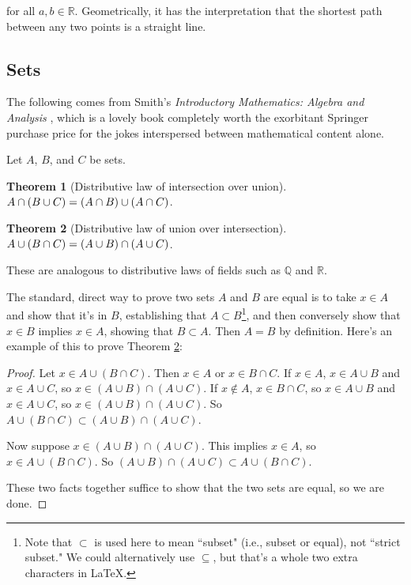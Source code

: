 \documentclass{article}
\theoremstyle{definition}
\newtheorem{theorem}{Theorem}[section]
\begin{document}
for all $a, b \in \mathbb{R}$. Geometrically, it has the interpretation that the shortest path between any two points is a straight line.

\subsection{Sets}

The following comes from Smith's \textit{Introductory Mathematics: Algebra and Analysis} \cite{smith}, which is a lovely book completely worth the exorbitant Springer purchase price for the jokes interspersed between mathematical content alone.

Let $A$, $B$, and $C$ be sets.

\begin{theorem}[Distributive law of intersection over union]
$\\ A \cap (B \cup C) = (A \cap B) \cup (A \cap C)$.
\end{theorem}

\begin{theorem}[Distributive law of union over intersection] \label{distributive-law-2}
$\\ A \cup (B \cap C) = (A \cup B) \cap (A \cup C)$.
\end{theorem}

These are analogous to distributive laws of fields such as $\mathbb{Q}$ and $\mathbb{R}$.

The standard, direct way to prove two sets $A$ and $B$ are equal is to take $x \in A$ and show that it's in $B$, establishing that $A \subset B$\footnote{Note that $\subset$ is used here to mean ``subset" (i.e., subset or equal), not ``strict subset." We could alternatively use $\subseteq$, but that's a whole two extra characters in \LaTeX.}, and then conversely show that $x \in B$ implies $x \in A$, showing that $B \subset A$. Then $A = B$ by definition. Here's an example of this to prove Theorem \ref{distributive-law-2}:

\begin{proof}
Let $x \in A \cup (B \cap C)$. Then $x \in A$ or $x \in B \cap C$. If $x \in A$, $x \in A \cup B$ and $x \in A \cup C$, so $x \in (A \cup B) \cap (A \cup C)$. If $x \notin A$, $x \in B \cap C$, so $x \in A \cup B$ and $x \in A \cup C$, so $x \in (A \cup B) \cap (A \cup C)$. So $A \cup (B \cap C) \subset (A \cup B) \cap (A \cup C)$.

Now suppose $x \in (A \cup B) \cap (A \cup C)$. This implies $x \in A$, so $x \in A \cup (B \cap C)$. So $(A \cup B) \cap (A \cup C) \subset A \cup (B \cap C)$.

These two facts together suffice to show that the two sets are equal, so we are done.
\end{proof} 
\end{document}
